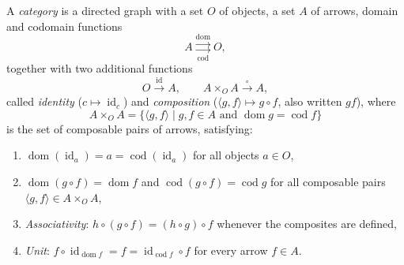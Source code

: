 A \emph{category} is a directed graph with a set $O$ of objects, a set $A$ of arrows, domain and codomain functions
$$
A \underset{\operatorname{cod}}{\overset{\operatorname{dom}}{\rightrightarrows}} O,
$$
together with two additional functions
$$
O \xrightarrow{\operatorname{id}} A, \qquad A \times_O A \xrightarrow{\circ} A,
$$
called \emph{identity} ($c \mapsto \operatorname{id}_c$) and \emph{composition} ($\langle g, f \rangle \mapsto g \circ f$, also written $gf$), where
$$
A \times_O A = \{ \langle g, f \rangle \mid g, f \in A \text{ and } \operatorname{dom} g = \operatorname{cod} f \}
$$
is the set of composable pairs of arrows, satisfying:
\begin{enumerate}
\item $\operatorname{dom}(\operatorname{id}_a) = a = \operatorname{cod}(\operatorname{id}_a)$ for all objects $a \in O$,
\item $\operatorname{dom}(g \circ f) = \operatorname{dom} f$ and $\operatorname{cod}(g \circ f) = \operatorname{cod} g$ for all composable pairs $\langle g, f \rangle \in A \times_O A$,
\item \emph{Associativity}: $h \circ (g \circ f) = (h \circ g) \circ f$ whenever the composites are defined,
\item \emph{Unit}: $f \circ \operatorname{id}_{\operatorname{dom} f} = f = \operatorname{id}_{\operatorname{cod} f} \circ f$ for every arrow $f \in A$.
\end{enumerate}
